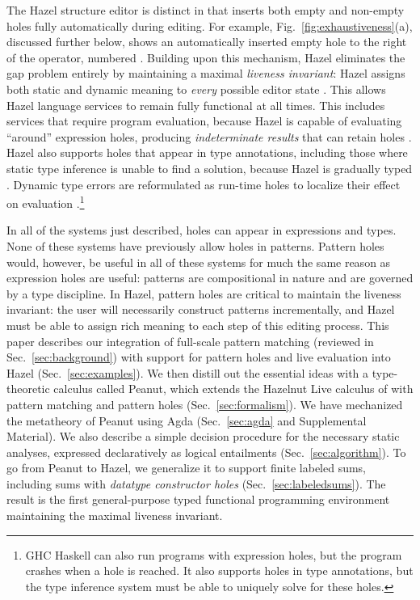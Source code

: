 The Hazel structure editor is distinct in that inserts both empty and non-empty holes fully automatically during editing.
For example, Fig.~\ref{fig:exhaustiveness}(a), discussed further below, shows an automatically inserted empty hole to the right of the \li{::} operator, numbered . Building upon this mechanism, Hazel eliminates the gap problem entirely by maintaining a maximal \emph{liveness invariant}: Hazel assigns both static and dynamic meaning to \emph{every} possible editor state \cite{DBLP:conf/popl/OmarVHAH17, DBLP:journals/pacmpl/OmarVCH19}. This allows Hazel language services to remain fully functional at all
times. This includes services that require program evaluation, because Hazel is capable of evaluating ``around'' 
expression holes, producing \emph{indeterminate results} that can retain holes \cite{DBLP:journals/pacmpl/OmarVCH19}. Hazel also supports holes that appear in type annotations, including those where static type inference is unable to find a solution, because Hazel is gradually typed \cite{DBLP:conf/snapl/SiekVCB15}. Dynamic type errors are reformulated as run-time holes to localize their effect on evaluation \cite{DBLP:journals/pacmpl/OmarVCH19}.\footnote{GHC Haskell can also run programs with expression holes, but the program crashes when a hole is reached. It also supports holes in type annotations, but the type inference system must be able to uniquely solve for these holes.}

In all of the systems just described, 
holes can appear in expressions and types.
None of these systems have previously allow holes in patterns. 
Pattern holes would, however, be useful in all of these systems for much the same reason as expression holes are useful: patterns are compositional in nature and are governed by a type discipline. 
In Hazel, pattern holes are critical to maintain the liveness invariant: the user will necessarily construct patterns incrementally, and Hazel must be able to assign rich meaning to each step of this editing process.
This paper describes our integration of full-scale pattern matching (reviewed in Sec.~\ref{sec:background}) with support for pattern holes and live evaluation into Hazel (Sec.~\ref{sec:examples}). We then distill out the essential ideas with a type-theoretic calculus called Peanut, which extends the Hazelnut Live calculus of \citet{DBLP:journals/pacmpl/OmarVCH19} with pattern matching and pattern holes (Sec.~\ref{sec:formalism}). We have mechanized the metatheory of Peanut using Agda (Sec.~\ref{sec:agda} and Supplemental Material). We also describe a simple decision procedure for the necessary static analyses, expressed declaratively as logical entailments (Sec.~\ref{sec:algorithm}). To go from Peanut to Hazel, we generalize it to support finite labeled sums, including sums with \emph{datatype constructor holes} (Sec.~\ref{sec:labeledsums}). The result is the first general-purpose typed functional programming environment maintaining the maximal liveness invariant.

